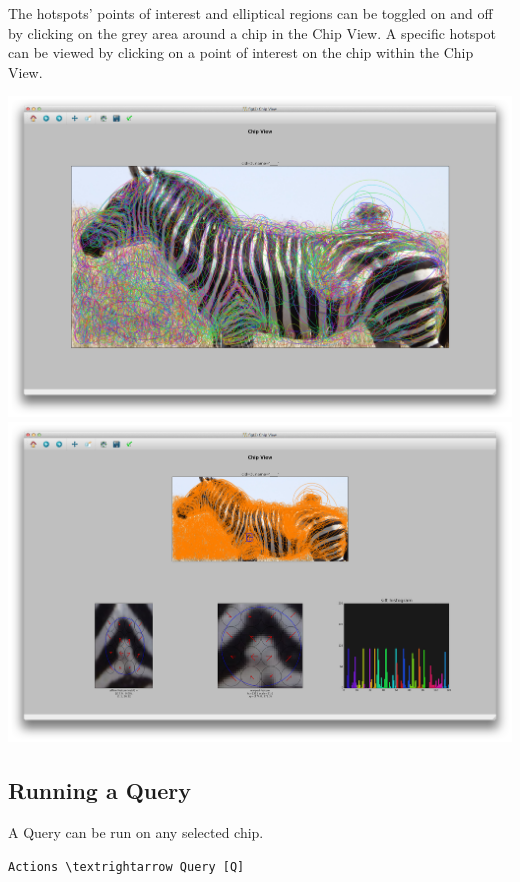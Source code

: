 \documentclass[a4paper,10pt]{article}
\begin{document}
        The hotspots' points of interest and elliptical regions can be
        toggled on and off by clicking on the grey area around a chip in the Chip View.
	A specific hotspot can be viewed by clicking on a point of interest on the chip within the Chip View.
        \begin{center}
            \includegraphics[scale=0.1]{images/chip-ellipse.png}
            \includegraphics[scale=0.1]{images/chip-hotspot.png}
        \end{center}

    \subsection{Running a Query}
        A Query can be run on any selected chip.

        \begin{Verbatim}[commandchars=\\\{\}]
        Actions \textrightarrow Query [Q]
        \end{Verbatim}
        
\end{document}
